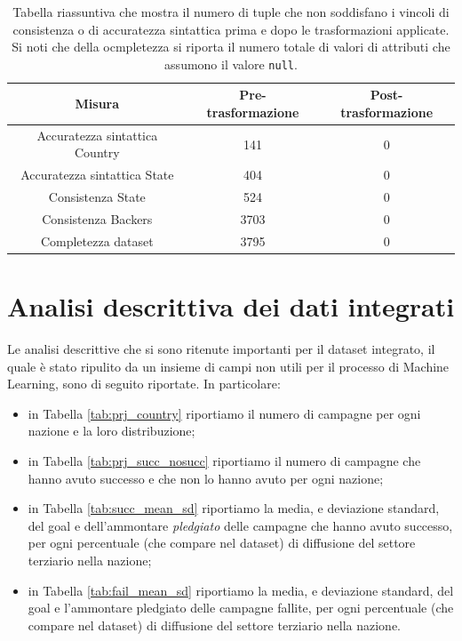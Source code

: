 	\begin{table}
		\caption{Tabella riassuntiva che mostra il numero di tuple che non soddisfano i vincoli di consistenza o di accuratezza sintattica prima e dopo le trasformazioni applicate. Si noti che della ocmpletezza si riporta il numero totale di valori di attributi che assumono il valore \texttt{null}.}
	
		\label{tab:recap}
	
		\centering
	\begin{tabular}{|c|c|c|}
		\hline 
		\textbf{Misura} & \textbf{Pre-trasformazione} & \textbf{Post-trasformazione} \\ 
		\hline 
		Accuratezza sintattica Country & 141 & 0 \\ 
		\hline
		Accuratezza sintattica State & 404 & 0 \\ 
		\hline 	
		Consistenza State & 524 & 0 \\ 
		\hline 
		Consistenza Backers & 3703 & 0 \\ 
		\hline 
		Completezza dataset & 3795 & 0 \\ 
		\hline 
	\end{tabular} 
\end{table}
\newpage
\section{Analisi descrittiva dei dati integrati}
Le analisi descrittive che si sono ritenute importanti per il dataset integrato, il quale è stato ripulito da un insieme di campi non utili per il processo di Machine Learning, sono di seguito riportate.
In particolare:
\begin{itemize}
	\item in Tabella \ref{tab:prj_country} riportiamo il numero di campagne per ogni nazione e la loro distribuzione;
	\item in Tabella \ref{tab:prj_succ_nosucc} riportiamo il numero di campagne che hanno avuto successo e che non lo hanno avuto per ogni nazione;
	\item in Tabella \ref{tab:succ_mean_sd} riportiamo la media, e deviazione standard, del goal e dell'ammontare \textit{pledgiato} delle campagne che hanno avuto successo, per ogni percentuale (che compare nel dataset) di diffusione del settore terziario nella nazione; 
	\item in Tabella \ref{tab:fail_mean_sd} riportiamo la media, e deviazione standard, del goal e l'ammontare pledgiato delle campagne fallite, per ogni percentuale (che compare nel dataset) di diffusione del settore terziario nella nazione.
\end{itemize} 

